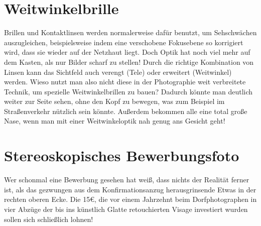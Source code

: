 \documentclass[a5paper,pagesize,10pt,bibtotoc,pointlessnumbers,normalheadings,DIV=9,twoside=false]{scrbook}
\begin{document}


\chapter{Weitwinkelbrille}

Brillen und Kontaktlinsen werden normalerweise dafür benutzt, um Sehschwächen auszugleichen, beispielsweise indem eine verschobene Fokusebene so korrigiert wird, dass sie wieder auf der Netzhaut liegt.
Doch Optik hat noch viel mehr auf dem Kasten, als nur Bilder scharf zu stellen!
Durch die richtige Kombination von Linsen kann das Sichtfeld auch verengt (Tele) oder erweitert (Weitwinkel) werden.
Wieso nutzt man also nicht diese in der Photographie weit verbreitete Technik, um spezielle Weitwinkelbrillen zu bauen?
Dadurch könnte man deutlich weiter zur Seite sehen, ohne den Kopf zu bewegen, was zum Beispiel im Straßenverkehr nützlich sein könnte.
Außerdem bekommen alle eine total große Nase, wenn man mit einer Weitwinkeloptik nah genug ans Gesicht geht!


\chapter{Stereoskopisches Bewerbungsfoto}

Wer schonmal eine Bewerbung gesehen hat weiß, dass nichts der Realität ferner ist, als das gezwungen aus dem Konfirmationsanzug herausgrinsende Etwas in der rechten oberen Ecke.
Die 15€, die vor einem Jahrzehnt beim Dorfphotographen in vier Abzüge der bis ins künstlich Glatte retouchierten Visage investiert wurden sollen sich schließlich lohnen!
\end{document}
